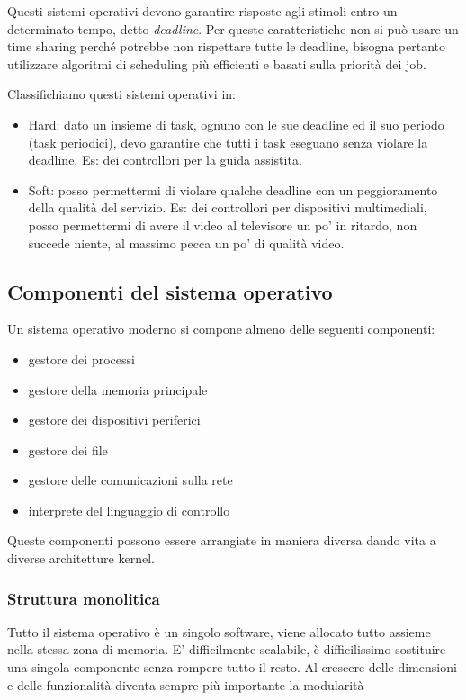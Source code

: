 Questi sistemi operativi devono garantire risposte agli stimoli entro un determinato tempo, detto \emph{deadline}. Per queste caratteristiche non si può usare un time sharing perché potrebbe non rispettare tutte le deadline, bisogna pertanto utilizzare algoritmi di scheduling più efficienti e basati sulla priorità dei job.

Classifichiamo questi sistemi operativi in:
\begin{itemize}
    \item Hard: dato un insieme di task, ognuno con le sue deadline ed il suo periodo (task periodici), devo garantire che tutti i task eseguano senza violare la deadline. Es: dei controllori per la guida assistita.

    \item Soft: posso permettermi di violare qualche deadline con un peggioramento della qualità del servizio. Es: dei controllori per dispositivi multimediali, posso permettermi di avere il video al televisore un po' in ritardo, non succede niente, al massimo pecca un po' di qualità video.
\end{itemize}

\subsection{Componenti del sistema operativo}
Un sistema operativo moderno si compone almeno delle seguenti componenti:
\begin{itemize}
    \item gestore dei processi
    \item gestore della memoria principale
    \item gestore dei dispositivi periferici
    \item gestore dei file
    \item gestore delle comunicazioni sulla rete
    \item interprete del linguaggio di controllo
\end{itemize}

Queste componenti possono essere arrangiate in maniera diversa dando vita a diverse architetture kernel.

\subsubsection{Struttura monolitica}
Tutto il sistema operativo è un singolo software, viene allocato tutto assieme nella stessa zona di memoria.
E' difficilmente scalabile, è difficilissimo sostituire una singola componente senza rompere tutto il resto.
Al crescere delle dimensioni e delle funzionalità diventa sempre più importante la modularità

